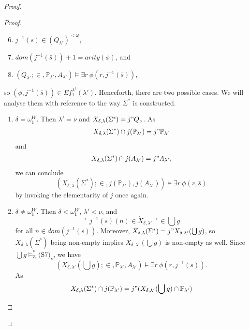 \documentclass[12pt, twoside]{memoir}
\numberwithin{equation}{section}
\theoremstyle{definition}
\theoremstyle{remark}
\theoremstyle{definition}
\theoremstyle{definition}
\theoremstyle{definition}
\theoremstyle{remark}
\newcommand{\eq}{=}
\begin{document}
\begin{proof}
\begin{proof}
\begin{enumerate}[label=<$k$> $\eq$ \arabic* :, leftmargin=70pt]
    \begin{enumerate}[label=(\alph*)]
        \setcounter{enumii}{5}
        \item $j^{-1}(\bar{s}) \in (Q_{\lambda'})^{< \omega}$, 
        \item $dom(j^{-1}(\bar{s})) + 1 = arity(\phi)$, and
        \item $(Q_{\lambda'}; \in, \mathbb{P}_{\lambda'}, A_{\lambda'}) \models \exists r \ \phi(r, j^{-1}(\bar{s}))$,
    \end{enumerate}
    so $(\phi, j^{-1}(\bar{s})) \in Ef_1^{\lambda^{\dagger}}(\lambda')$. Henceforth, there are two possible cases. We will analyse them with reference to the way $\Sigma^*$ is constructed. 
    \begin{enumerate}[label=Case \arabic*:, leftmargin=50pt]
        \item\label{c7c1} $\delta = \omega_1^W$. Then $\lambda' = \nu$ and $X_{\delta, \lambda}(\Sigma^*) = j" Q_{\nu}$. As 
        \begin{align*}
            X_{\delta, \lambda}(\Sigma^*) \cap j(\mathbb{P}_{\lambda'}) = j" \mathbb{P}_{\lambda'}
        \end{align*}
        and
        \begin{align*}
            X_{\delta, \lambda}(\Sigma^*) \cap j(A_{\lambda'}) = j" A_{\lambda'},
        \end{align*}
        we can conclude 
        \begin{equation*}
            (X_{\delta, \lambda}(\Sigma^*); \in, j(\mathbb{P}_{\lambda'}), j(A_{\lambda'})) \models \exists r \ \phi(r, \bar{s})
        \end{equation*} 
        by invoking the elementarity of $j$ once again.
        \item $\delta \neq \omega_1^W$. Then $\delta < \omega_1^W$, $\lambda' < \nu$, and $$\ulcorner j^{-1}(\bar{s})(n) \in \dot{X}_{\delta, \lambda'} \urcorner \in \bigcup g$$ for all $n \in dom(j^{-1}(\bar{s}))$. Moreover, $X_{\delta, \lambda}(\Sigma^*) = j" X_{\delta, \lambda'}(\bigcup g)$, so $X_{\delta, \lambda}(\Sigma^*)$ being non-empty implies $X_{\delta, \lambda'}(\bigcup g)$ is non-empty as well. Since $\bigcup g \models^*_{\mathfrak{A}} \hyperref[c7]{\text{(S7)}_{\nu}}$, we have $$(X_{\delta, \lambda'}(\bigcup g); \in, \mathbb{P}_{\lambda'}, A_{\lambda'}) \models \exists r \ \phi(r, j^{-1}(\bar{s})).$$ As 
        \begin{align*}
            X_{\delta, \lambda}(\Sigma^*) \cap j(\mathbb{P}_{\lambda'}) = j" (X_{\delta, \lambda'}(\bigcup g) \cap \mathbb{P}_{\lambda'})

\end{align*}
\end{enumerate}
\end{enumerate}
\end{proof}
\end{proof}
\end{document}
